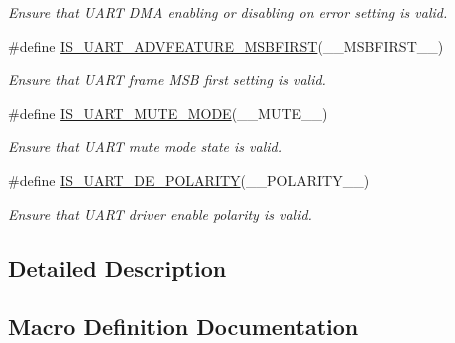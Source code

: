\begin{DoxyCompactItemize}
\begin{DoxyCompactList}\small\item\em Ensure that U\+A\+RT D\+MA enabling or disabling on error setting is valid. \end{DoxyCompactList}\item 
\#define \hyperlink{group___u_a_r_t___private___macros_ga82289de330949918b037acf94fb12aef}{I\+S\+\_\+\+U\+A\+R\+T\+\_\+\+A\+D\+V\+F\+E\+A\+T\+U\+R\+E\+\_\+\+M\+S\+B\+F\+I\+R\+ST}(\+\_\+\+\_\+\+M\+S\+B\+F\+I\+R\+S\+T\+\_\+\+\_\+)
\begin{DoxyCompactList}\small\item\em Ensure that U\+A\+RT frame M\+SB first setting is valid. \end{DoxyCompactList}\item 
\#define \hyperlink{group___u_a_r_t___private___macros_ga9df22e11f8bc82847fbe16b6f073ae04}{I\+S\+\_\+\+U\+A\+R\+T\+\_\+\+M\+U\+T\+E\+\_\+\+M\+O\+DE}(\+\_\+\+\_\+\+M\+U\+T\+E\+\_\+\+\_\+)
\begin{DoxyCompactList}\small\item\em Ensure that U\+A\+RT mute mode state is valid. \end{DoxyCompactList}\item 
\#define \hyperlink{group___u_a_r_t___private___macros_gaecf169f01673ae67b12b3155e074bf12}{I\+S\+\_\+\+U\+A\+R\+T\+\_\+\+D\+E\+\_\+\+P\+O\+L\+A\+R\+I\+TY}(\+\_\+\+\_\+\+P\+O\+L\+A\+R\+I\+T\+Y\+\_\+\+\_\+)
\begin{DoxyCompactList}\small\item\em Ensure that U\+A\+RT driver enable polarity is valid. \end{DoxyCompactList}\end{DoxyCompactItemize}


\subsection{Detailed Description}


\subsection{Macro Definition Documentation}
\mbox{\label{group___u_a_r_t___private___macros_gaa4cf2a15ad7ae46e2905debeef35a908}} 

